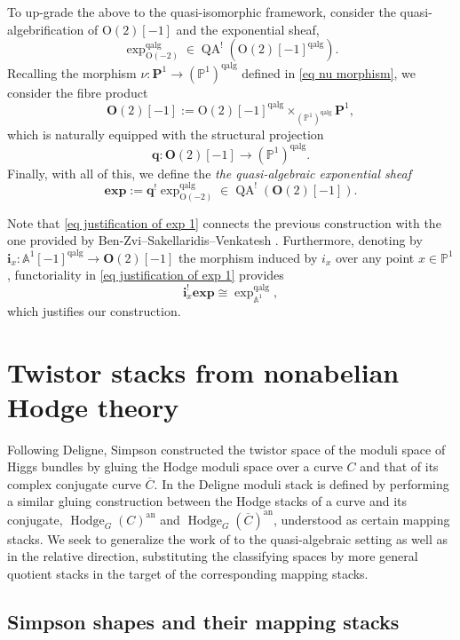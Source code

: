 \documentclass[11pt, a4paper]{amsart}
\numberwithin{equation}{section}
\theoremstyle{definition}
\theoremstyle{remark}
\DeclareMathOperator{\an}{an}
\DeclareMathOperator{\Hodge}{Hodge}
\DeclareMathOperator{\QA}{QA}
\DeclareMathOperator{\qalg}{\mathrm{qalg}}
\renewcommand{\O}{\mathrm{O}}
\newcommand{\OO}{\mathbf{O}}
\renewcommand{\P}{\mathbf{P}}
\newcommand{\ol}[1]{\overline{#1}}
\renewcommand{\AA}{\mathbb{A}}
\newcommand{\PP}{\mathbb{P}}
\renewcommand{\to}{\longrightarrow}
\begin{document}
To up-grade the above to the quasi-isomorphic framework, consider the quasi-algebrification of $\O(2)[-1]$ and the exponential sheaf,
\[
\exp_{\O(-2)}^{\qalg} \in \QA^!(\O(2)[-1]^{\qalg}).
\]
Recalling the morphism $\nu : \P^1 \to (\PP^1)^{\qalg}$ defined in \eqref{eq nu morphism}, we consider the fibre product
\[
\OO(2)[-1] := \O(2)[-1]^{\qalg} \times_{(\PP^1)^{\qalg}} \P^1,
\]
which is naturally equipped with the structural projection
\[
\mathbf{q} : \OO(2)[-1] \to (\PP^1)^{\qalg}.
\]
Finally, with all of this, we define the {\it the quasi-algebraic exponential sheaf}
\[
\mathbf{exp} := \mathbf{q}^! \exp_{\O(-2)}^{\qalg} \in \QA^!(\OO(2)[-1]).
\]

Note that \eqref{eq justification of exp 1} connects the previous construction with the one provided by Ben-Zvi--Sakellaridis--Venkatesh \cite[Appendix A.2]{BZSV}. Furthermore, denoting by $\mathbf{i}_x : \AA^1[-1]^{\qalg} \to \OO(2)[-1]$ the morphism induced by $i_x$ over any point $x \in \PP^1$, functoriality in \eqref{eq justification of exp 1} provides
\[
\mathbf{i}_x^! \mathbf{exp} \cong \exp_{\AA^1}^{\qalg},
\]
which justifies our construction.






\section{Twistor stacks from nonabelian Hodge theory} \label{section nonabelian Hodge review}


Following Deligne, Simpson constructed \cite{simpson_hodge_2} the twistor space of the moduli space of Higgs bundles by gluing the Hodge moduli space over a curve $C$ and that of its complex conjugate curve $\ol{C}$. In \cite{franco&hanson} the Deligne moduli stack is defined by performing a similar gluing construction between the Hodge stacks of a curve and its conjugate, $\Hodge_{G}(C)^{\an}$ and $\Hodge_{G}(\ol{C})^{\an}$, understood as certain mapping stacks. We seek to generalize the work of \cite{franco&hanson} to the quasi-algebraic setting as well as in the relative direction, substituting the classifying spaces by more general quotient stacks in the target of the corresponding mapping stacks.




\subsection{Simpson shapes and their mapping stacks}
\label{sc simpson shapes and mapping stacks}
\end{document}
